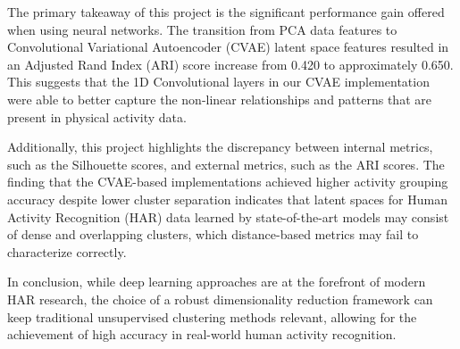 \documentclass[12pt]{IEEEtran}
\begin{document}
The primary takeaway of this project is the significant performance gain offered when using neural networks. The transition from PCA data features to Convolutional Variational Autoencoder (CVAE) latent space features resulted in an Adjusted Rand Index (ARI) score increase from 0.420 to approximately 0.650. This suggests that the 1D Convolutional layers in our CVAE implementation were able to better capture the non-linear relationships and patterns that are present in physical activity data.

Additionally, this project highlights the discrepancy between internal metrics, such as the Silhouette scores, and external metrics, such as the ARI scores. The finding that the CVAE-based implementations achieved higher activity grouping accuracy despite lower cluster separation indicates that latent spaces for Human Activity Recognition (HAR) data learned by state-of-the-art models may consist of dense and overlapping clusters, which distance-based metrics may fail to characterize correctly.

In conclusion, while deep learning approaches are at the forefront of modern HAR research, the choice of a robust dimensionality reduction framework can keep traditional unsupervised clustering methods relevant, allowing for the achievement of high accuracy in real-world human activity recognition.
\end{document}
